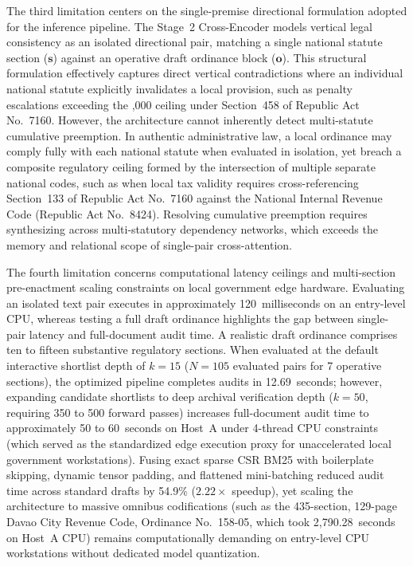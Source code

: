 The third limitation centers on the single-premise directional formulation adopted for the inference pipeline. The Stage~2 Cross-Encoder models vertical legal consistency as an isolated directional pair, matching a single national statute section ($\mathbf{s}$) against an operative draft ordinance block ($\mathbf{o}$). This structural formulation effectively captures direct vertical contradictions where an individual national statute explicitly invalidates a local provision, such as penalty escalations exceeding the ,000 ceiling under Section~458 of Republic Act No.~7160. However, the architecture cannot inherently detect multi-statute cumulative preemption. In authentic administrative law, a local ordinance may comply fully with each national statute when evaluated in isolation, yet breach a composite regulatory ceiling formed by the intersection of multiple separate national codes, such as when local tax validity requires cross-referencing Section~133 of Republic Act No.~7160 against the National Internal Revenue Code (Republic Act No.~8424). Resolving cumulative preemption requires synthesizing across multi-statutory dependency networks, which exceeds the memory and relational scope of single-pair cross-attention.

The fourth limitation concerns computational latency ceilings and multi-section pre-enactment scaling constraints on local government edge hardware. Evaluating an isolated text pair executes in approximately 120~milliseconds on an entry-level CPU, whereas testing a full draft ordinance highlights the gap between single-pair latency and full-document audit time. A realistic draft ordinance comprises ten to fifteen substantive regulatory sections. When evaluated at the default interactive shortlist depth of $k=15$ ($N = 105$ evaluated pairs for 7 operative sections), the optimized pipeline completes audits in 12.69~seconds; however, expanding candidate shortlists to deep archival verification depth ($k=50$, requiring 350 to 500 forward passes) increases full-document audit time to approximately 50 to 60~seconds on Host~A under 4-thread CPU constraints (which served as the standardized edge execution proxy for unaccelerated local government workstations). Fusing exact sparse CSR BM25 with boilerplate skipping, dynamic tensor padding, and flattened mini-batching reduced audit time across standard drafts by 54.9\% ($2.22\times$ speedup), yet scaling the architecture to massive omnibus codifications (such as the 435-section, 129-page Davao City Revenue Code, Ordinance No.~158-05, which took 2,790.28~seconds on Host~A CPU) remains computationally demanding on entry-level CPU workstations without dedicated model quantization.

